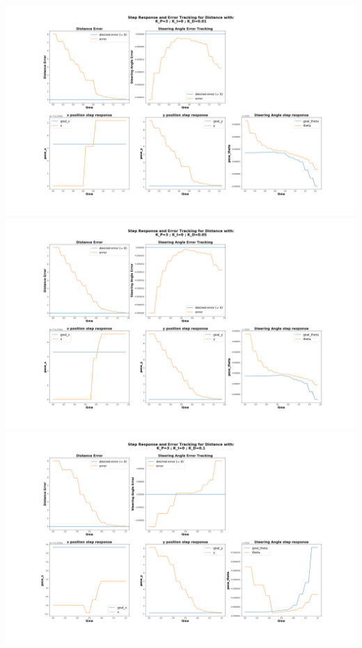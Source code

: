 \documentclass[a4paper,12pt]{article}
\begin{document}
	\includegraphics[scale=0.25]{images/control_dist_3_0_0.01.png}\\
	\includegraphics[scale=0.25]{images/control_dist_3_0_0.05.png}\\
	\includegraphics[scale=0.25]{images/control_dist_3_0_0.1.png}
\end{document}
